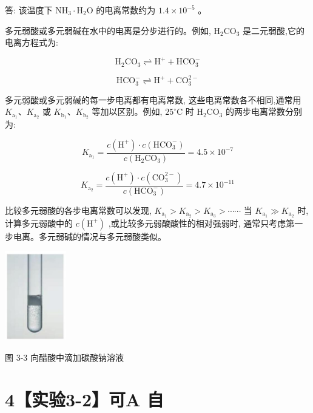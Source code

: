 \documentclass[10pt]{article}
\begin{document}
答: 该温度下 \({\mathrm{{NH}}}_{3} \cdot {\mathrm{H}}_{2}\mathrm{O}\) 的电离常数约为 \({1.4} \times {10}^{-5}\) 。

多元弱酸或多元弱碱在水中的电离是分步进行的。例如, \({\mathrm{H}}_{2}{\mathrm{{CO}}}_{3}\) 是二元弱酸,它的电离方程式为:

\[
{\mathrm{H}}_{2}{\mathrm{{CO}}}_{3} \rightleftharpoons {\mathrm{H}}^{ + } + {\mathrm{{HCO}}}_{3}^{ - }
\]

\[
{\mathrm{{HCO}}}_{3}^{ - } \rightleftharpoons {\mathrm{H}}^{ + } + {\mathrm{{CO}}}_{3}^{2 - }
\]

多元弱酸或多元弱碱的每一步电离都有电离常数, 这些电离常数各不相同,通常用 \({K}_{{\mathrm{a}}_{1}}\text{、}{K}_{{\mathrm{a}}_{2}}\) 或 \({K}_{{\mathrm{b}}_{1}}\text{、}{K}_{{\mathrm{b}}_{2}}\) 等加以区别。例如, \({25}^{ \circ }\mathrm{C}\) 时 \({\mathrm{H}}_{2}{\mathrm{{CO}}}_{3}\) 的两步电离常数分别为:

\[
{K}_{{\mathrm{a}}_{1}} = \frac{c\left( {\mathrm{H}}^{ + }\right) \cdot c\left( {\mathrm{{HCO}}}_{3}^{ - }\right) }{c\left( {{\mathrm{H}}_{2}{\mathrm{{CO}}}_{3}}\right) } = {4.5} \times {10}^{-7}
\]

\[
{K}_{{\mathrm{a}}_{2}} = \frac{c\left( {\mathrm{H}}^{ + }\right) \cdot c\left( {\mathrm{{CO}}}_{3}^{2 - }\right) }{c\left( {\mathrm{{HCO}}}_{3}^{ - }\right) } = {4.7} \times {10}^{-{11}}
\]

比较多元弱酸的各步电离常数可以发现, \({K}_{{\mathrm{a}}_{1}} > {K}_{{\mathrm{a}}_{2}} > {K}_{{\mathrm{a}}_{3}} > \cdots \cdots\) 当 \({K}_{{\mathrm{a}}_{1}} \gg {K}_{{\mathrm{a}}_{2}}\) 时,计算多元弱酸中的 \(c\left( {\mathrm{H}}^{ + }\right)\) ,或比较多元弱酸酸性的相对强弱时, 通常只考虑第一步电离。多元弱碱的情况与多元弱酸类似。

\begin{center}
\includegraphics[max width=0.2\textwidth]{images/0190da9d-8bfd-732f-bc2c-0b21d0f13b91_66_870321.jpg}
\end{center}

图 3-3 向醋酸中滴加碳酸钠溶液

\section*{4【实验3-2】可A 自}
\end{document}
